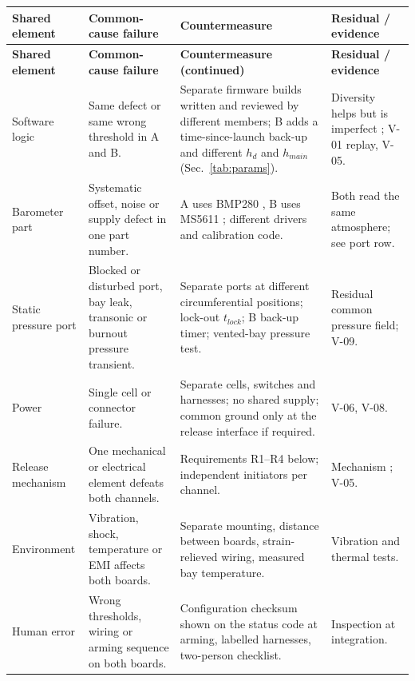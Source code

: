 \small
{}
\begin{longtable}{@{}L{25mm}L{38mm}L{52mm}L{35mm}@{}}
\toprule{}\textbf{Shared element}&\textbf{Common-cause failure}&\textbf{Countermeasure}&\textbf{Residual / evidence}\\\midrule\endfirsthead
\toprule{}\textbf{Shared element}&\textbf{Common-cause failure}&\textbf{Countermeasure (continued)}&\textbf{Residual / evidence}\\\midrule\endhead
\bottomrule\endlastfoot
Software logic & Same defect or same wrong threshold in A and B. & Separate firmware builds written and reviewed by different members; B adds a time-since-launch back-up and different $h_d$ and $h_{main}$ (Sec.~\ref{tab:params}). & Diversity helps but is imperfect \cite{knight1986}; V-01 replay, V-05.\\
Barometer part & Systematic offset, noise or supply defect in one part number. & A uses BMP280 \cite{bmp280ds}, B uses MS5611 \cite{ms5611ds}; different drivers and calibration code. & Both read the same atmosphere; see port row.\\
Static pressure port & Blocked or disturbed port, bay leak, transonic or burnout pressure transient. & Separate ports at different circumferential positions; lock-out $t_{lock}$; B back-up timer; vented-bay pressure test. & Residual common pressure field; V-09.\\
Power & Single cell or connector failure. & Separate cells, switches and harnesses; no shared supply; common ground only at the release interface if required. & V-06, V-08.\\
Release mechanism & One mechanical or electrical element defeats both channels. & Requirements R1--R4 below; independent initiators per channel. & Mechanism ; V-05.\\
Environment & Vibration, shock, temperature or EMI affects both boards. & Separate mounting, distance between boards, strain-relieved wiring, measured bay temperature. & Vibration and thermal tests.\\
Human error & Wrong thresholds, wiring or arming sequence on both boards. & Configuration checksum shown on the status code at arming, labelled harnesses, two-person checklist. & Inspection at integration.\\
\end{longtable}
\normalsize

